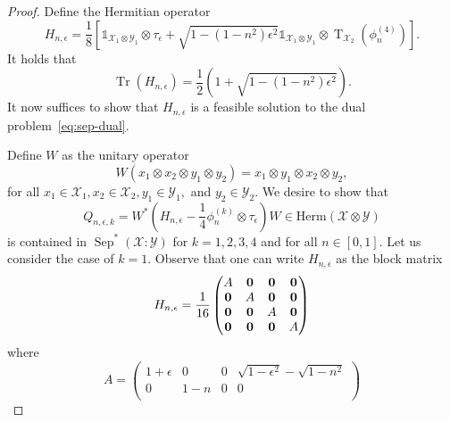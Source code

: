 \documentclass[11pt]{article}
\theoremstyle{definition}
\newcommand{\tr}{\operatorname{Tr}}
\newcommand{\pt}{\operatorname{T}}
\newcommand{\sep}{\operatorname{Sep}}
\newcommand{\I}{\mathbb{1}}
\newcommand{\setft}[1]{\mathrm{#1}}
\newcommand{\Herm}{\setft{Herm}}
\newcommand{\X}{\mathcal{X}}
\newcommand{\Y}{\mathcal{Y}}
\begin{document}
\begin{proof}
    Define the Hermitian operator
    \begin{equation}
        H_{n, \epsilon} = \frac{1}{8} \left[ \I_{\X_1 \otimes \Y_1} \otimes
        \tau_{\epsilon} + \sqrt{1 - (1 - n^2)\epsilon^2} \I_{\X_1 \otimes \Y_1}
        \otimes \pt_{\X_2}\left(\phi_n^{(4)}\right) \right].
    \end{equation}
    It holds that
    \begin{equation} \label{eq:trace-h}
        \tr(H_{n, \epsilon}) = \frac{1}{2} \left(1 + \sqrt{1 - (1 - n^2)
        \epsilon^2} \right).
    \end{equation}
    It now suffices to show that $H_{n, \epsilon}$ is a feasible solution to
    the dual problem~\eqref{eq:sep-dual}.

    Define $W$ as the unitary operator
    \begin{equation}
        W(x_1 \otimes x_2 \otimes y_1 \otimes y_2) = x_1 \otimes y_1 \otimes
        x_2 \otimes y_2, 
    \end{equation}
    for all $x_1 \in \X_1, x_2 \in \X_2, y_1 \in \Y_1,$ and $y_2 \in \Y_2$. We
    desire to show that 
    \begin{equation}
        Q_{n, \epsilon, k} = W^* \left( H_{n, \epsilon} - \frac{1}{4}
        \phi_n^{(k)} \otimes \tau_{\epsilon} \right) W \in \Herm(\X \otimes \Y)
    \end{equation}
    is contained in $\sep^*(\X : \Y)$ for $k = 1, 2, 3, 4$ and for all $n \in
    [0, 1]$.
    Let us consider the case of $k=1$. Observe that one can write $H_{n,
    \epsilon}$ as the block matrix
    \begin{equation}
        H_{n, \epsilon} = 
        \frac{1}{16}
        \begin{pmatrix}
            A & \bf{0} & \bf{0} & \bf{0} \\
            \bf{0} & A & \bf{0} & \bf{0} \\
            \bf{0} & \bf{0} & A & \bf{0} \\
            \bf{0} & \bf{0} & \bf{0} & A
        \end{pmatrix}
    \end{equation}
    where 
    \begin{equation}
        A =
        \begin{pmatrix}
            1 + \epsilon & 0 & 0 & \sqrt{1-\epsilon^2} - \sqrt{1 - n^2} \\
            0 & 1-n & 0 & 0 \\

\end{pmatrix}
\end{equation}
\end{proof}
\end{document}
